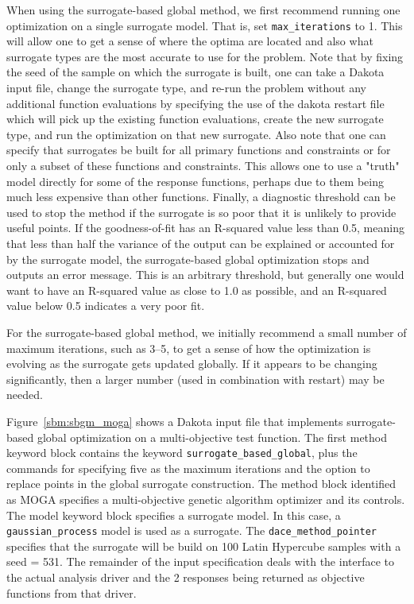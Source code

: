 When using the surrogate-based global method, we first recommend
running one optimization on a single surrogate model. That is, set
\texttt{max\_iterations} to 1.  This will allow one to get a sense of
where the optima are located and also what surrogate types are the
most accurate to use for the problem.  Note that by fixing the seed of
the sample on which the surrogate is built, one can take a Dakota
input file, change the surrogate type, and re-run the problem without
any additional function evaluations by specifying the use of the
dakota restart file which will pick up the existing function
evaluations, create the new surrogate type, and run the optimization
on that new surrogate.  Also note that one can specify that surrogates
be built for all primary functions and constraints or for only a
subset of these functions and constraints.  This allows one to use a
"truth" model directly for some of the response functions, perhaps due
to them being much less expensive than other functions.  Finally, a
diagnostic threshold can be used to stop the method if the surrogate
is so poor that it is unlikely to provide useful points.  If the
goodness-of-fit has an R-squared value less than 0.5, meaning that
less than half the variance of the output can be explained or
accounted for by the surrogate model, the surrogate-based global
optimization stops and outputs an error message.  This is an arbitrary
threshold, but generally one would want to have an R-squared value as
close to 1.0 as possible, and an R-squared value below 0.5 indicates a
very poor fit.

For the surrogate-based global method, we initially recommend a small
number of maximum iterations, such as 3--5, to get a sense of how the
optimization is evolving as the surrogate gets updated globally.  If
it appears to be changing significantly, then a larger number (used in
combination with restart) may be needed.

Figure~\ref{sbm:sbgm_moga} shows a Dakota input file that implements
surrogate-based global optimization on a multi-objective test function. 
The first method keyword block contains the
keyword \texttt{surrogate\_based\_global}, plus the commands for
specifying five as the maximum iterations and the option to replace 
points in the global surrogate construction. The method block identified 
as MOGA specifies a multi-objective genetic algorithm optimizer and its 
controls.  The model keyword block specifies a surrogate model.  
In this case, a \texttt{gaussian\_process} model is used as a surrogate. 
The \texttt{dace\_method\_pointer} specifies that the surrogate will be 
build on 100 Latin Hypercube samples with a seed = 531.
The remainder of the input specification deals with the interface 
to the actual analysis driver and the 2 responses being returned 
as objective functions from that driver. 

